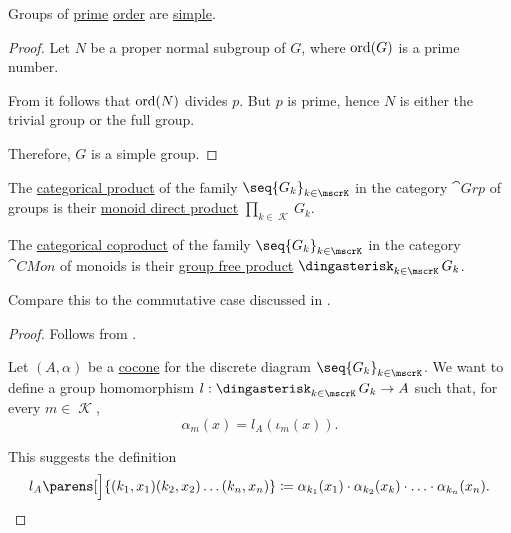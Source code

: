 \begin{proposition}\label{thm:cyclic_groups_are_simple}
  Groups of \hyperref[def:prime_number]{prime} \hyperref[def:group_order]{order} are \hyperref[def:simple_object]{simple}.
\end{proposition}
\begin{proof}
  Let \( N \) be a proper normal subgroup of \( G \), where \( \operatorname{ord}(G) \) is a prime number.

  From  it follows that \( \operatorname{ord}(N) \) divides \( p \). But \( p \) is prime, hence \( N \) is either the trivial group or the full group.

  Therefore, \( G \) is a simple group.
\end{proof}

\begin{proposition}\label{thm:group_categorical_limits}
  \hfill
  \begin{thmenum}
     The \hyperref[def:discrete_category_limits]{categorical product} of the family \( \seq{ G_k }_{k \in \mscrK} \) in the category \hyperref[def:group/category]{\( \cat{Grp} \)} of groups is their \hyperref[def:first_order_direct_product]{monoid direct product} \( \prod_{k \in \mscrK} G_k \).

     The \hyperref[def:discrete_category_limits]{categorical coproduct} of the family \( \seq{ G_k }_{k \in \mscrK} \) in the category \hyperref[def:monoid/category]{\( \cat{CMon} \)} of  monoids is their \hyperref[def:group_free_product]{group free product} \( \Ast_{k \in \mscrK} G_k \).

    Compare this to the commutative case discussed in .
  \end{thmenum}
\end{proposition}
\begin{proof}
   Follows from .

    Let \( (A, \alpha) \) be a \hyperref[def:category_of_cones/cocone]{cocone} for the discrete diagram \( \seq{ G_k }_{k \in \mscrK} \). We want to define a group homomorphism \( l: \Ast_{k \in \mscrK} G_k \to A \) such that, for every \( m \in \mscrK \),
  \begin{equation*}
    \alpha_m(x) = l_A(\iota_m(x)).
  \end{equation*}

  This suggests the definition
  \begin{equation*}
    l_A\parens[\Big]{ (k_1, x_1) (k_2, x_2) \ldots (k_n, x_n) } \coloneqq \alpha_{k_1}(x_1) \cdot \alpha_{k_2}(x_k) \cdot \ldots \cdot \alpha_{k_n}(x_n).
  \end{equation*}
\end{proof}
